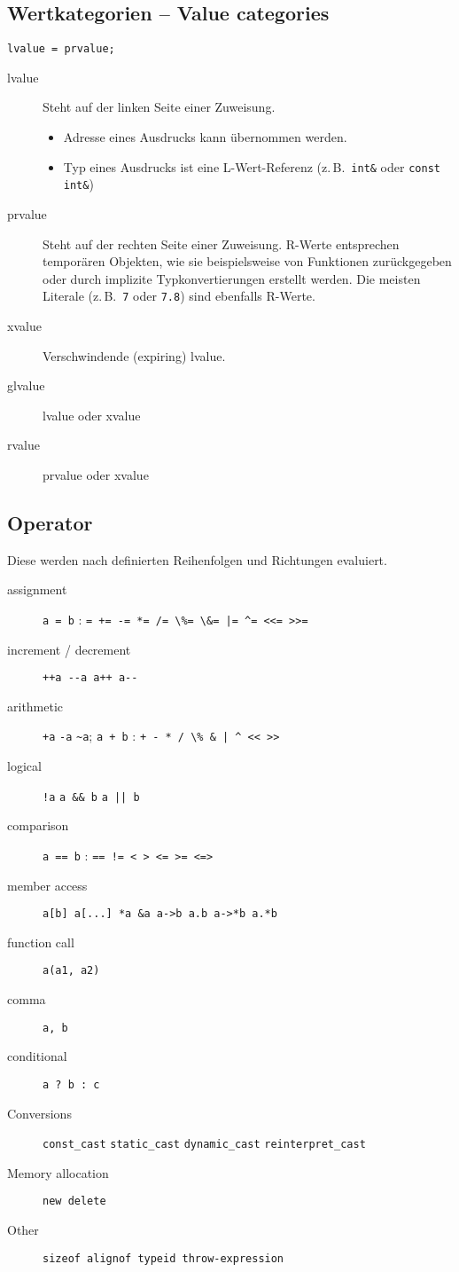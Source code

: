 \documentclass[10pt,twocolumn]{scrartcl}
\begin{document}
\subsection{Wertkategorien -- Value categories}

\lstinline|lvalue = prvalue;|

\begin{description}
  \item[lvalue] Steht auf der linken Seite einer Zuweisung.
  \begin{itemize}
    \item Adresse eines Ausdrucks kann übernommen werden.
    \item Typ eines Ausdrucks ist eine L-Wert-Referenz (z.\,B.\ \lstinline|int&|
    oder \lstinline|const int&|)
  \end{itemize}
  \item[prvalue] Steht auf der rechten Seite einer Zuweisung. R-Werte
  entsprechen temporären Objekten, wie sie beispielsweise von Funktionen
  zurückgegeben oder durch implizite Typkonvertierungen erstellt werden. Die
  meisten Literale (z.\,B.\ \lstinline|7| oder \lstinline|7.8|) sind ebenfalls
  R-Werte.
  \item[xvalue] Verschwindende (expiring) lvalue.
  \item[glvalue] lvalue oder xvalue
  \item[rvalue] prvalue oder xvalue
\end{description}

\subsection{Operator}

Diese werden nach definierten Reihenfolgen und Richtungen evaluiert.

\begin{description}
  \item[assignment] \lstinline|a = b| :
    \lstinline"= += -= *= /= \%= \&= |= ^= <<= >>="
  \item[increment / decrement] \lstinline|++a --a a++ a--|
  \item[arithmetic]
    \lstinline|+a| \lstinline|-a| \lstinline|~a|;
    \lstinline|a + b| :
    \lstinline"+ - * / \% & | ^ << >>"
  \item[logical]
    \lstinline|!a|
    \lstinline|a && b|
    \lstinline"a || b"
  \item[comparison] \lstinline|a == b| :
    \lstinline|== != < > <= >= <=>|
  \item[member access] \lstinline|a[b] a[...] *a &a a->b a.b a->*b a.*b|
  \item[function call] \lstinline|a(a1, a2)|
  \item[comma] \lstinline|a, b|
  \item[conditional] \lstinline|a ? b : c|
  \item[Conversions] \lstinline|const_cast| \lstinline|static_cast|
    \lstinline|dynamic_cast| \lstinline|reinterpret_cast|
  \item[Memory allocation] \lstinline|new delete|
  \item[Other] \lstinline|sizeof alignof typeid throw-expression|
\end{description}
\end{document}
